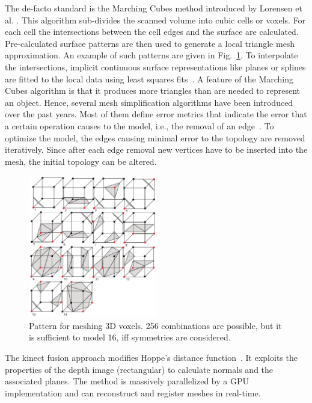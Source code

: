 \documentclass[twocolumn,oneside]{book}
\begin{document}
\begin{itemize}
  The de-facto standard is the Marching Cubes method introduced by
  Lorensen et al. \cite{lorensen87marching}. This algorithm
  sub-divides the scanned volume into cubic cells or voxels. For each
  cell the intersections between the cell edges and the surface are
  calculated. Pre-calculated surface patterns are then used to
  generate a local triangle mesh approximation. An example of such
  patterns are given in Fig.~\ref{fig:patterns}. To interpolate the
  intersections, implicit continuous surface representations like
  planes or splines are fitted to the local data using least squares
  fits~\cite{alexa02computing,hoppe}.
  A feature of the Marching Cubes algorithm is that it produces more
  triangles than are needed to represent an object.  Hence, several
  mesh simplification algorithms have been introduced over the past
  years. Most of them define error metrics that indicate the error
  that a certain operation causes to the model, i.e., the removal of
  an edge~\cite{melax98simple, garland97surface}. To optimize the
  model, the edges causing minimal error to the topology are removed
  iteratively. Since after each edge removal new vertices have to be
  inserted into the mesh, the initial topology can be altered.
\begin{figure}
    \includegraphics[width=0.5\textwidth]{BOOKFIGS/marching_cube_patterns}
\caption{Pattern for meshing 3D voxels. 256 combinations are possible,
  but it is sufficient to model 16, iff symmetries are considered.
\label{fig:patterns}}
\end{figure}

  The kinect fusion approach modifies Hoppe's distance
  function~\cite{kinectfusion}. It exploits the properties of the
  depth image (rectangular) to calculate normals and the associated
  planes. The method is massively parallelized by a GPU implementation
  and can reconstruct and register meshes in real-time.


\end{itemize}
\end{document}
